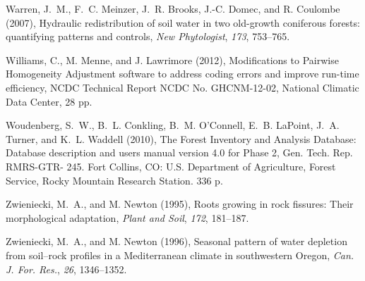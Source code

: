 Warren, J.~M., F.~C. Meinzer, J.~R. Brooks, J.-C. Domec, and R. Coulombe (2007), Hydraulic redistribution of soil water in two old-growth coniferous forests: quantifying patterns and controls,
\textit{New Phytologist}, \textit{173}, 753--765.

Williams, C., M. Menne, and J. Lawrimore (2012), Modifications to Pairwise Homogeneity Adjustment software to address coding errors and improve run-time efficiency, NCDC Technical Report NCDC No. GHCNM-12-02, National Climatic Data Center, 28 pp.

Woudenberg, S.~W., B.~L. Conkling, B.~M. O'Connell, E.~B. LaPoint, J.~A. Turner, and K.~L. Waddell (2010), The Forest Inventory and Analysis Database: Database description and users manual version 4.0 for Phase 2, Gen. Tech. Rep. RMRS-GTR- 245. Fort Collins, CO: U.S. Department of Agriculture, Forest Service, Rocky Mountain Research Station. 336 p.

Zwieniecki, M.~A., and M. Newton (1995), Roots growing in rock fissures: Their morphological adaptation, 
\textit{Plant and Soil}, \textit{172}, 181--187.

Zwieniecki, M.~A., and M. Newton (1996), Seasonal pattern of water depletion from soil--rock profiles in a Mediterranean climate in southwestern Oregon, 
\textit{Can. J. For. Res.}, \textit{26}, 1346--1352.
